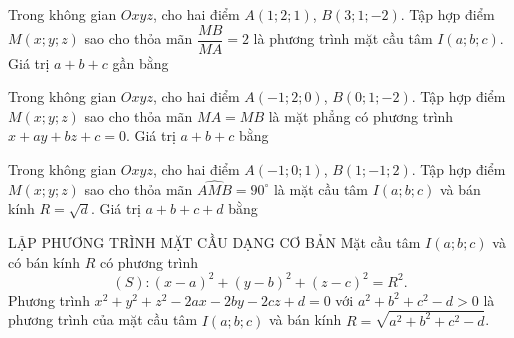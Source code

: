 \begin{ex}%
	Trong không gian $Oxyz$, cho hai điểm $A(1;2;1)$, $B(3;1;-2)$. Tập hợp điểm $M(x;y;z)$ sao cho thỏa mãn $\dfrac{MB}{MA}=2$ là phương trình mặt cầu tâm $I(a;b;c)$. Giá trị $a+b+c$ gần bằng
\end{ex}
\begin{ex}%
	Trong không gian $Oxyz$, cho hai điểm $A(-1;2;0)$, $B(0;1;-2)$. Tập hợp điểm $M(x;y;z)$ sao cho thỏa mãn $MA=MB$ là mặt phẳng có phương trình $x+ay+bz+c=0$. Giá trị $a+b+c$ bằng
\end{ex}
\begin{ex}%
	Trong không gian $Oxyz$, cho hai điểm $A(-1;0;1)$, $B(1;-1;2)$. Tập hợp điểm $M(x;y;z)$ sao cho thỏa mãn $\widehat{AMB}=90^\circ$ là mặt cầu tâm $I(a;b;c)$ và bán kính $R=\sqrt{d}$. Giá trị $a+b+c+d$ bằng
\end{ex}
\begin{dang}{LẬP PHƯƠNG TRÌNH MẶT CẦU DẠNG CƠ BẢN}
Mặt cầu tâm $I(a;b;c)$ và có bán kính $R$ có phương trình $$(S)\colon{(x-a)^2}+(y-b)^2+(z-c)^2=R^2.$$	
Phương trình $x^2+y^2+z^2-2ax-2by-2cz+d=0$ với $a^2+b^2+c^2-d>0$ là phương trình của mặt cầu tâm $I(a;b;c)$ và bán kính $R=\sqrt{a^2+b^2+c^2-d}$.	
\end{dang}

